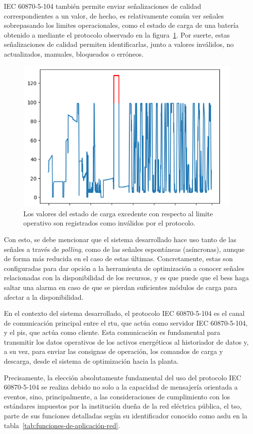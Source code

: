 IEC 60870-5-104 también permite enviar señalizaciones de calidad correspondientes a un valor, de hecho, es relativamente común ver señales sobrepasando los limites operacionales, como el estado de carga de una batería obtenido a mediante el protocolo observado en la figura~\ref{fig:overflow-soc}. Por suerte, estas señalizaciones de calidad permiten identificarlas, junto a valores inválidos, no actualizados, manuales, bloqueados o erróneos.

\begin{figure}
  \centering
  \includegraphics[width=0.5\linewidth]{figures/overflow-soc.png}
  \caption[Estado de carga excedente.]{Los valores del estado de carga excedente con respecto al limite operativo son registrados como inválidos por el protocolo.}
  \label{fig:overflow-soc}
\end{figure}

Con esto, se debe mencionar que el sistema desarrollado hace uso tanto de las señales a través de \textit{polling}, como de las señales espontáneas (asíncronas), aunque de forma más reducida en el caso de estas últimas. Concretamente, estas son configuradas para dar opción a la herramienta de optimización a conocer señales relacionadas con la disponibilidad de los recursos, y es que puede que el \gls{bess} haga saltar una alarma en caso de que se pierdan suficientes módulos de carga para afectar a la disponibilidad.

En el contexto del sistema desarrollado, el protocolo IEC 60870-5-104 es el canal de comunicación principal entre el \gls{rtu}, que actúa como servidor IEC 60870-5-104, y el \gls{pis}, que actúa como cliente. Esta comunicación es fundamental para transmitir los datos operativos de los activos energéticos al historiador de datos y, a su vez, para enviar las consignas de operación, los comandos de carga y descarga, desde el sistema de optimización hacia la planta.

Precisamente, la elección absolutamente fundamental del uso del protocolo IEC 60870-5-104 se realiza debido no solo a la capacidad de mensajería orientada a eventos, sino, principalmente, a las consideraciones de cumplimiento con los estándares impuestos por la institución dueña de la red eléctrica pública, el \gls{tso}, parte de sus funciones detalladas según su identificador conocido como \gls{asdu} en la tabla~\ref{tab:funciones-de-aplicación-red}.

